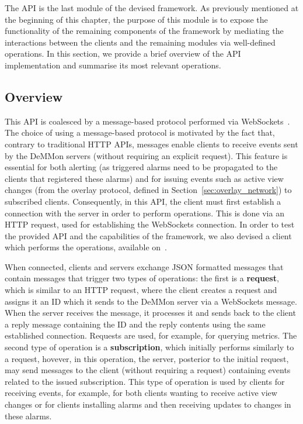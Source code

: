 
The API is the last module of the devised framework. As previously mentioned at the beginning of this chapter, the purpose of this module is to expose the functionality of the remaining components of the framework by mediating the interactions between the clients and the remaining modules via well-defined operations. In this section, we provide a brief overview of the API implementation and summarise its most relevant operations. 

\subsection{Overview}

This API is coalesced by a message-based protocol performed via WebSockets~\cite{websocketsRFC}. The choice of using a message-based protocol is motivated by the fact that, contrary to traditional HTTP APIs, messages enable clients to receive events sent by the DeMMon servers (without requiring an explicit request). This feature is essential for both alerting (as triggered alarms need to be propagated to the clients that registered these alarms) and for issuing events such as active view changes (from the overlay protocol, defined in Section~\ref{sec:overlay_network}) to subscribed clients. Consequently, in this API, the client must first establish a connection with the server in order to perform operations. This is done via an HTTP request, used for establishing the WebSockets connection. In order to test the provided API and the capabilities of the framework, we also devised a client which performs the operations, available on~\cite{demmon-client-repo}.

When connected, clients and servers exchange JSON formatted messages that contain messages that trigger two types of operations: the first is a \textbf{request}, which is similar to an HTTP request, where the client creates a request and assigns it an ID which it sends to the DeMMon server via a WebSockets message. When the server receives the message, it processes it and sends back to the client a reply message containing the ID and the reply contents using the same established connection. Requests are used, for example, for querying metrics. The second type of operation is a \textbf{subscription}, which initially performs similarly to a request, hovever, in this operation, the server, posterior to the initial request, may send messages to the client (without requiring a request) containing events related to the issued subscription. This type of operation is used by clients for receiving events, for example, for both clients wanting to receive active view changes or for clients installing alarms and then receiving updates to changes in these alarms.

